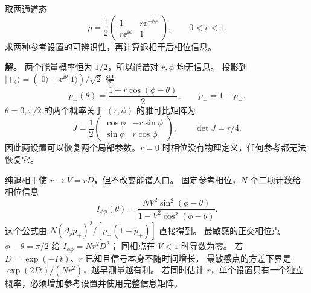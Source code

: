 \begin{exbox}
取两通道态
\begin{equation}
\rho=\frac12\begin{pmatrix}1&r\ee^{-\ii\phi}\\r\ee^{\ii\phi}&1\end{pmatrix},
\qquad0<r<1.
\label{eq:feqo-two-level-state}
\end{equation}
求两种参考设置的可辨识性，再计算退相干后相位信息。

\textbf{解。}
两个能量概率恒为 $1/2$，所以能谱对 $r,\phi$ 均无信息。
投影到 $|+_\theta\rangle=(|0\rangle+\ee^{\ii\theta}|1\rangle)/\sqrt2$ 得
\begin{equation}
p_+(\theta)=\frac{1+r\cos(\phi-\theta)}2,
\qquad p_-=1-p_+.
\label{eq:feqo-reference-phase-probability}
\end{equation}
$\theta=0,\pi/2$ 的两个概率关于 $(r,\phi)$ 的雅可比矩阵为
\begin{equation}
J=\frac12\begin{pmatrix}\cos\phi&-r\sin\phi\\
\sin\phi&r\cos\phi\end{pmatrix},\qquad\det J=r/4.
\label{eq:feqo-jacobian-two-level}
\end{equation}
因此两设置可以恢复两个局部参数。$r=0$ 时相位没有物理定义，任何参考都无法恢复它。

纯退相干使 $r\to V=rD$，但不改变能谱人口。
固定参考相位，$N$ 个二项计数给相位信息
\begin{equation}
I_{\phi\phi}(\theta)
=\frac{NV^2\sin^2(\phi-\theta)}{1-V^2\cos^2(\phi-\theta)}.
\label{eq:feqo-fisher-phase-decoherence}
\end{equation}
这个公式由 $N(\partial_\phi p_+)^2/[p_+(1-p_+)]$ 直接得到。
最敏感的正交相位点 $\phi-\theta=\pi/2$ 给 $I_{\phi\phi}=Nr^2D^2$；
同相点在 $V<1$ 时导数为零。
若 $D=\exp(-\Gamma t)$、$r$ 已知且信号本身不随时间增长，
最敏感点的方差下界是 $\exp(2\Gamma t)/(Nr^2)$，越早测量越有利。
若同时估计 $r$，单个设置只有一个独立概率，必须增加参考设置并使用完整信息矩阵。
\end{exbox}
